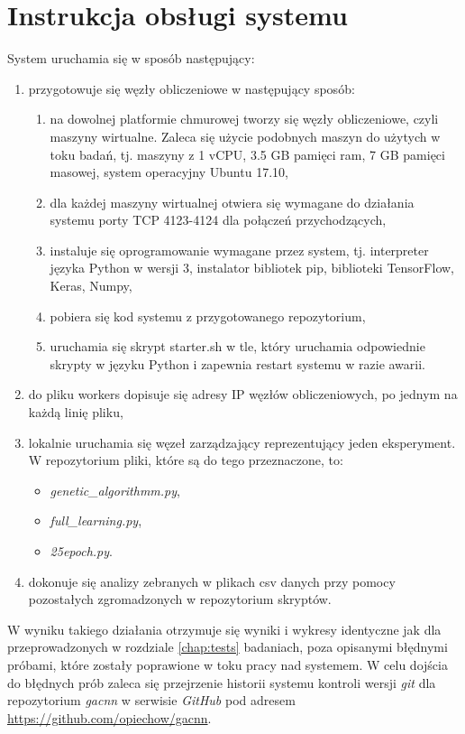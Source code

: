 \chapter[Dodatek C]{Instrukcja obsługi systemu}

System uruchamia się w sposób następujący:
\begin{enumerate}
  \item przygotowuje się węzły obliczeniowe w następujący sposób:
  \begin{enumerate}
    \item na dowolnej platformie chmurowej tworzy się węzły obliczeniowe, czyli maszyny wirtualne.
    Zaleca się użycie podobnych maszyn do użytych w toku badań, tj. maszyny z 1 vCPU, 3.5 GB pamięci ram, 7 GB pamięci masowej, system operacyjny Ubuntu 17.10,
    \item dla każdej maszyny wirtualnej otwiera się wymagane do działania systemu porty TCP 4123-4124 dla połączeń przychodzących,
    \item instaluje się oprogramowanie wymagane przez system, tj. interpreter języka Python w wersji 3, instalator bibliotek pip, biblioteki TensorFlow, Keras, Numpy,
    \item pobiera się kod systemu z przygotowanego repozytorium,
    \item uruchamia się skrypt starter.sh w tle, który uruchamia odpowiednie skrypty w języku Python i zapewnia restart systemu w razie awarii.
  \end{enumerate}
  \item do pliku workers dopisuje się adresy IP węzłów obliczeniowych, po jednym na każdą linię pliku,
  \item lokalnie uruchamia się węzeł zarządzający reprezentujący jeden eksperyment.
  W repozytorium pliki, które są do tego przeznaczone, to:
  \begin{itemize}
    \item \textit{genetic\_algorithmm.py},
    \item \textit{full\_learning.py},
    \item \textit{25epoch.py}.
  \end{itemize}
  \item dokonuje się analizy zebranych w plikach csv danych przy pomocy pozostałych zgromadzonych w repozytorium skryptów.
\end{enumerate}
W wyniku takiego działania otrzymuje się wyniki i wykresy identyczne jak dla przeprowadzonych w rozdziale \ref{chap:tests} badaniach, poza opisanymi błędnymi próbami, które zostały poprawione w toku pracy nad systemem.
W celu dojścia do błędnych prób zaleca się przejrzenie historii systemu kontroli wersji \textit{git} dla repozytorium \textit{gacnn} w serwisie \textit{GitHub} pod adresem \url{https://github.com/opiechow/gacnn}.
